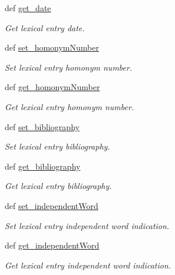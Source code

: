 \begin{DoxyCompactItemize}
def \hyperlink{classlmf_1_1src_1_1core_1_1lexical__entry_1_1_lexical_entry_ae8d874e16530609d02844a04c1cf1ec5}{get\+\_\+date}
\begin{DoxyCompactList}\small\item\em Get lexical entry date. \end{DoxyCompactList}\item 
def \hyperlink{classlmf_1_1src_1_1core_1_1lexical__entry_1_1_lexical_entry_a7f1def059e7cb83693727e36df501e62}{set\+\_\+homonym\+Number}
\begin{DoxyCompactList}\small\item\em Set lexical entry homonym number. \end{DoxyCompactList}\item 
def \hyperlink{classlmf_1_1src_1_1core_1_1lexical__entry_1_1_lexical_entry_a526cd4c368d55317f6cda8d507865fd6}{get\+\_\+homonym\+Number}
\begin{DoxyCompactList}\small\item\em Get lexical entry homonym number. \end{DoxyCompactList}\item 
def \hyperlink{classlmf_1_1src_1_1core_1_1lexical__entry_1_1_lexical_entry_ab918c4abc48ca39893be6d25f564b84a}{set\+\_\+bibliography}
\begin{DoxyCompactList}\small\item\em Set lexical entry bibliography. \end{DoxyCompactList}\item 
def \hyperlink{classlmf_1_1src_1_1core_1_1lexical__entry_1_1_lexical_entry_af6682cbe4dee446ab8d4488fa36ae832}{get\+\_\+bibliography}
\begin{DoxyCompactList}\small\item\em Get lexical entry bibliography. \end{DoxyCompactList}\item 
def \hyperlink{classlmf_1_1src_1_1core_1_1lexical__entry_1_1_lexical_entry_aef758dd6e01b35dc780e0c8b9f7124d2}{set\+\_\+independent\+Word}
\begin{DoxyCompactList}\small\item\em Set lexical entry independent word indication. \end{DoxyCompactList}\item 
def \hyperlink{classlmf_1_1src_1_1core_1_1lexical__entry_1_1_lexical_entry_aa30f1aec6f435fea3185aa555c44d8b7}{get\+\_\+independent\+Word}
\begin{DoxyCompactList}\small\item\em Get lexical entry independent word indication. \end{DoxyCompactList}\item 

\end{DoxyCompactItemize}
